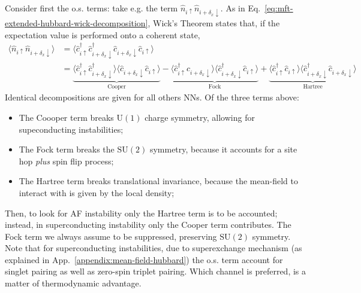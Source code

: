 Consider first the o.s. terms: take e.g. the term $\hat n_{i\uparrow} \hat n_{i + \delta_x \downarrow}$. As in Eq.~\eqref{eq:mft-extended-hubbard-wick-decomposition}, Wick's Theorem states that, if the expectation value is performed onto a coherent state,
\[
\begin{aligned}
	\langle 
		\hat n_{i\uparrow} \hat n_{i + \delta_x \downarrow}
	\rangle &= \langle 
		\hat c_{i\uparrow}^\dagger \hat c_{i + \delta_x \downarrow}^\dagger \hat c_{i + \delta_x \downarrow} \hat c_{i\uparrow} 
	\rangle \\
	&= 
	\underbrace{
		\langle 
			\hat c_{i\uparrow}^\dagger \hat c_{i + \delta_x \downarrow}^\dagger
		\rangle \langle	
			\hat c_{i + \delta_x \downarrow} \hat c_{i\uparrow} 
		\rangle 
	}_{\text{Cooper}}
	- 
	\underbrace{
		\langle 
			\hat c_{i\uparrow}^\dagger \hat c_{i + \delta_x \downarrow}
		\rangle \langle	
			\hat c_{i + \delta_x \downarrow}^\dagger \hat c_{i\uparrow} 
		\rangle 
	}_{\text{Fock}}
	+ 
	\underbrace{
		\langle 
			\hat c_{i\uparrow}^\dagger \hat c_{i\uparrow}
		\rangle \langle	
			\hat c_{i + \delta_x \downarrow}^\dagger \hat c_{i + \delta_x \downarrow} 
		\rangle
	}_{\text{Hartree}}
\end{aligned}
\]
Identical decompositions are given for all others NNs. Of the three terms above:
\begin{itemize}
	\item The Coooper term breaks $\mathrm{U}(1)$ charge symmetry, allowing for supeconducting instabilities;
	\item The Fock term breaks the $\mathrm{SU}(2)$ symmetry, because it accounts for a site hop \textit{plus} spin flip process;
	\item The Hartree term breaks translational invariance, because the mean-field to interact with is given by the local density;
\end{itemize}
Then, to look for AF instability only the Hartree term is to be accounted; instead, in superconducting instability only the Cooper term contributes. The Fock term we always assume to be suppressed, preserving $\mathrm{SU}(2)$ symmetry. Note that for superconducting instabilities, due to superexchange mechanism (as explained in App.~\ref{appendix:mean-field-hubbard}) the o.s. term account for singlet pairing as well as zero-spin triplet pairing. Which channel is preferred, is a matter of thermodynamic advantage.

